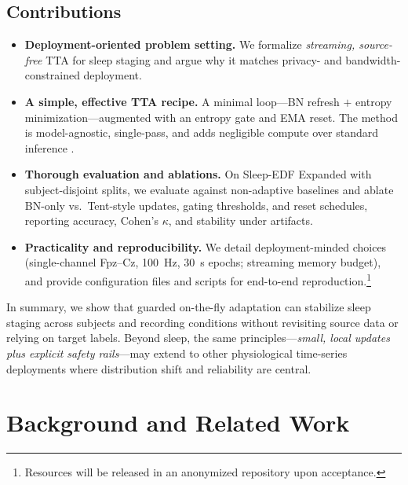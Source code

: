 \documentclass{article}
\begin{document}
\subsection{Contributions}
\begin{itemize}
  \item \textbf{Deployment-oriented problem setting.} We formalize \emph{streaming, source-free} TTA for sleep staging and argue why it matches privacy- and bandwidth-constrained deployment.
  \item \textbf{A simple, effective TTA recipe.} A minimal loop---BN refresh $+$ entropy minimization---augmented with an entropy gate and EMA reset. The method is model-agnostic, single-pass, and adds negligible compute over standard inference \citep{li2016adabn,wang2021tent}.
  \item \textbf{Thorough evaluation and ablations.} On Sleep-EDF Expanded with subject-disjoint splits, we evaluate against non-adaptive baselines and ablate BN-only vs.\ Tent-style updates, gating thresholds, and reset schedules, reporting accuracy, Cohen's $\kappa$, and stability under artifacts.
  \item \textbf{Practicality and reproducibility.} We detail deployment-minded choices (single-channel Fpz--Cz, 100~Hz, 30~s epochs; streaming memory budget), and provide configuration files and scripts for end-to-end reproduction.\footnote{Resources will be released in an anonymized repository upon acceptance.}
\end{itemize}

In summary, we show that guarded on-the-fly adaptation can stabilize sleep staging across subjects and recording conditions without revisiting source data or relying on target labels. Beyond sleep, the same principles---\emph{small, local updates plus explicit safety rails}---may extend to other physiological time-series deployments where distribution shift and reliability are central.


\section{Background and Related Work}
\end{document}

